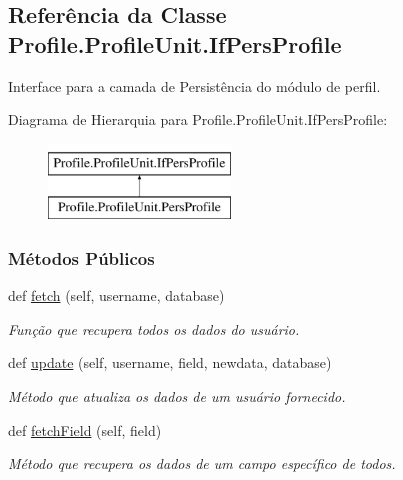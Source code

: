 \hypertarget{classProfile_1_1ProfileUnit_1_1IfPersProfile}{}\subsection{Referência da Classe Profile.\+Profile\+Unit.\+If\+Pers\+Profile}
\label{classProfile_1_1ProfileUnit_1_1IfPersProfile}


Interface para a camada de Persistência do módulo de perfil.  


Diagrama de Hierarquia para Profile.\+Profile\+Unit.\+If\+Pers\+Profile\+:\begin{figure}[H]
\begin{center}
\leavevmode
\includegraphics[height=2.000000cm]{d2/dec/classProfile_1_1ProfileUnit_1_1IfPersProfile}
\end{center}
\end{figure}
\subsubsection*{Métodos Públicos}
\begin{DoxyCompactItemize}
\item 
def \hyperlink{classProfile_1_1ProfileUnit_1_1IfPersProfile_aeb92a2bc236905b748015965a0da62f0}{fetch} (self, username, database)
\begin{DoxyCompactList}\small\item\em Função que recupera todos os dados do usuário. \end{DoxyCompactList}\item 
def \hyperlink{classProfile_1_1ProfileUnit_1_1IfPersProfile_a3a9da33f5497c97807cce70960d9db1a}{update} (self, username, field, newdata, database)
\begin{DoxyCompactList}\small\item\em Método que atualiza os dados de um usuário fornecido. \end{DoxyCompactList}\item 
def \hyperlink{classProfile_1_1ProfileUnit_1_1IfPersProfile_aafcfa1f16047754f81a1622499ea5ba0}{fetch\+Field} (self, field)
\begin{DoxyCompactList}\small\item\em Método que recupera os dados de um campo específico de todos. \end{DoxyCompactList}\end{DoxyCompactItemize}


